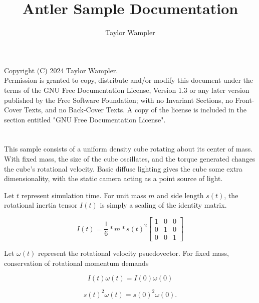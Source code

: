 \documentclass[a4paper,12pt]{book}
\title{Antler Sample Documentation}
\author{Taylor Wampler}
\date{ }
\begin{document}

\maketitle

Copyright (C) 2024 Taylor Wampler. \\

Permission is granted to copy, distribute and/or modify this document under the terms of the GNU Free Documentation License, Version 1.3 or any later version published by the Free Software Foundation; with no Invariant Sections, no Front-Cover Texts, and no Back-Cover Texts. A copy of the license is included in the section entitled "GNU Free Documentation License".

\tableofcontents
\markboth{}{}

\chapter*{}

This sample consists of a uniform density cube rotating about its center of mass. With fixed mass, the size of the cube oscillates, and the torque generated changes the cube's rotational velocity. Basic diffuse lighting gives the cube some extra dimensionality, with the static camera acting as a point source of light. 

Let $t$ represent simulation time.
For unit mass $m$ and side length $s(t)$, the rotational inertia tensor $I(t)$ is simply a scaling of the identity matrix.

\begin{equation*}
I(t) = \frac{1}{6} * m * s(t)^2
\begin{bmatrix}
1 & 0 & 0 \\
0 & 1 & 0 \\
0 & 0 & 1
\end{bmatrix}
\end{equation*}

Let $\omega(t)$ represent the rotational velocity psuedovector. For fixed mass, conservation of rotational momentum demands

\begin{equation*}
I(t) \omega(t) = I(0) \omega(0)
\end{equation*}

\begin{equation}\label{eq:rot-cube:cons-rot-mom}
s(t)^2 \omega(t) = s(0)^2 \omega(0).
\end{equation}
\end{document}
